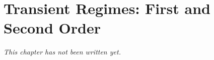 \chapter{Transient Regimes: First and Second Order}\label{ch:b1:transient-regimes}


\emph{This chapter has not been written yet.}
